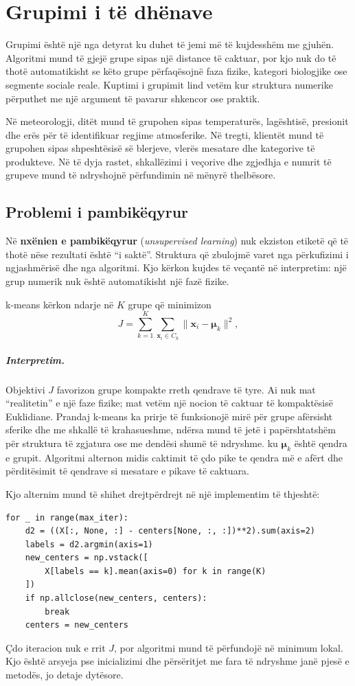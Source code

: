 \documentclass[12pt,a4paper,oneside]{book}
\newcommand{\term}[2]{\textbf{#1} (\textit{#2})}
\begin{document}
\chapter[Grupimi]{Grupimi i të dhënave}

Grupimi është një nga detyrat ku duhet të jemi më të kujdesshëm me gjuhën. Algoritmi mund të gjejë grupe sipas një distance të caktuar, por kjo nuk do të thotë automatikisht se këto grupe përfaqësojnë faza fizike, kategori biologjike ose segmente sociale reale. Kuptimi i grupimit lind vetëm kur struktura numerike përputhet me një argument të pavarur shkencor ose praktik.

Në meteorologji, ditët mund të grupohen sipas temperaturës, lagështisë, presionit dhe erës për të identifikuar regjime atmosferike. Në tregti, klientët mund të grupohen sipas shpeshtësisë së blerjeve, vlerës mesatare dhe kategorive të produkteve. Në të dyja rastet, shkallëzimi i veçorive dhe zgjedhja e numrit të grupeve mund të ndryshojnë përfundimin në mënyrë thelbësore.
\section{Problemi i pambikëqyrur}

Në \term{nxënien e pambikëqyrur}{unsupervised learning} nuk ekziston etiketë që të thotë nëse rezultati është ``i saktë''. Struktura që zbulojmë varet nga përkufizimi i ngjashmërisë dhe nga algoritmi. Kjo kërkon kujdes të veçantë në interpretim: një grup numerik nuk është automatikisht një fazë fizike.

k-means kërkon ndarje në $K$ grupe që minimizon
\[
J=\sum_{k=1}^K\sum_{\mathbf x_i\in C_k}\|\mathbf x_i-\boldsymbol\mu_k\|^2,
\]

\paragraph{Interpretim.}
Objektivi $J$ favorizon grupe kompakte rreth qendrave të tyre. Ai nuk mat ``realitetin'' e një faze fizike; mat vetëm një nocion të caktuar të kompaktësisë Euklidiane. Prandaj k-means ka prirje të funksionojë mirë për grupe afërsisht sferike dhe me shkallë të krahasueshme, ndërsa mund të jetë i papërshtatshëm për struktura të zgjatura ose me dendësi shumë të ndryshme.
ku $\boldsymbol\mu_k$ është qendra e grupit. Algoritmi alternon midis caktimit të çdo pike te qendra më e afërt dhe përditësimit të qendrave si mesatare e pikave të caktuara.

Kjo alternim mund të shihet drejtpërdrejt në një implementim të thjeshtë:
\begin{lstlisting}[caption={Hapat bazë të k-means.}]
for _ in range(max_iter):
    d2 = ((X[:, None, :] - centers[None, :, :])**2).sum(axis=2)
    labels = d2.argmin(axis=1)
    new_centers = np.vstack([
        X[labels == k].mean(axis=0) for k in range(K)
    ])
    if np.allclose(new_centers, centers):
        break
    centers = new_centers
\end{lstlisting}
Çdo iteracion nuk e rrit $J$, por algoritmi mund të përfundojë në minimum lokal. Kjo është arsyeja pse inicializimi dhe përsëritjet me fara të ndryshme janë pjesë e metodës, jo detaje dytësore.
\end{document}
